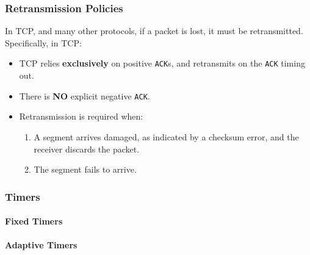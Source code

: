 \subsubsection{Retransmission Policies}\label{subsubsec:Retransmission_Policies}
In TCP, and many other protocols, if a packet is lost, it must be retransmitted.
Specifically, in TCP:\@
\begin{itemize}[noitemsep]
\item TCP relies \textbf{exclusively} on positive \texttt{ACK}s, and retransmits on the \texttt{ACK} timing out.
\item There is \textbf{NO} explicit negative \texttt{ACK}.
\item Retransmission is required when:
  \begin{enumerate}[noitemsep]
  \item A segment arrives damaged, as indicated by a checksum error, and the receiver discards the packet.
  \item The segment fails to arrive.
  \end{enumerate}
\end{itemize}

\subsubsection{Timers}\label{subsubsec:Packet_Timers}
\paragraph{Fixed Timers}\label{par:Fixed_Packet_Timers}
\paragraph{Adaptive Timers}\label{par:Adaptive_Packet_Timers}
